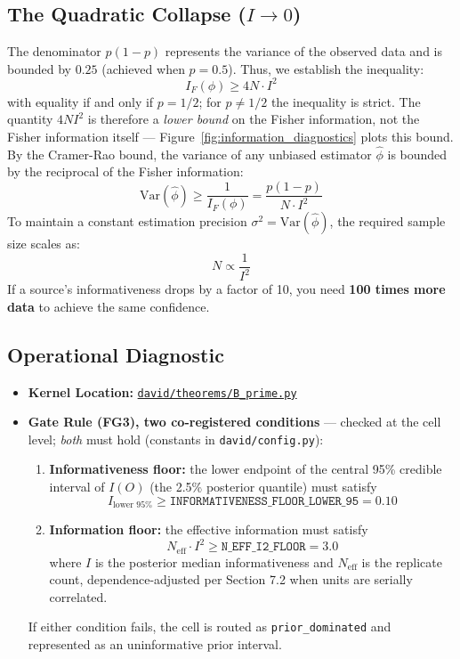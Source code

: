 \documentclass[11pt,a4paper]{article}
\begin{document}
\subsection{The Quadratic Collapse ($I \to 0$)}
The denominator $p(1 - p)$ represents the variance of the observed data and is bounded by $0.25$ (achieved when $p = 0.5$). Thus, we establish the inequality:
\begin{equation}\label{eq:scaling_bound}
I_F(\phi) \ge 4 N \cdot I^2
\end{equation}
with equality if and only if $p = 1/2$; for $p \neq 1/2$ the inequality is strict. The quantity $4NI^2$ is therefore a \emph{lower bound} on the Fisher information, not the Fisher information itself --- Figure~\ref{fig:information_diagnostics} plots this bound. %
By the Cramer-Rao bound, the variance of any unbiased estimator $\hat{\phi}$ is bounded by the reciprocal of the Fisher information:
\[
\text{Var}(\hat{\phi}) \ge \frac{1}{I_F(\phi)} = \frac{p(1-p)}{N \cdot I^2}
\]
To maintain a constant estimation precision $\sigma^2 = \text{Var}(\hat{\phi})$, the required sample size scales as:
\[
N \propto \frac{1}{I^2}
\]
If a source's informativeness drops by a factor of 10, you need \textbf{100 times more data} to achieve the same confidence.

\subsection{Operational Diagnostic}
\begin{itemize}
    \item \textbf{Kernel Location:} \href{file:///Users/arbenlila/development/david/canonical/david/theorems/B_prime.py}{\texttt{david/theorems/B\_prime.py}}
    \item \textbf{Gate Rule (FG3), two co-registered conditions} --- checked at the cell level; \emph{both} must hold (constants in \texttt{david/config.py}): %
    \begin{enumerate}
        \item \textbf{Informativeness floor:} the lower endpoint of the central 95\% credible interval of $I(O)$ (the 2.5\% posterior quantile) must satisfy
        \[
        I_{\text{lower 95\%}} \ge \texttt{INFORMATIVENESS\_FLOOR\_LOWER\_95} = 0.10 %
        \]
        \item \textbf{Information floor:} the effective information must satisfy
        \[
        N_{\mathrm{eff}} \cdot I^2 \ge \texttt{N\_EFF\_I2\_FLOOR} = 3.0 %
        \]
        where $I$ is the posterior median informativeness and $N_{\mathrm{eff}}$ is the replicate count, dependence-adjusted per Section 7.2 when units are serially correlated. %
    \end{enumerate}
    If either condition fails, the cell is routed as \texttt{prior\_dominated} and represented as an uninformative prior interval.
\end{itemize}
\end{document}
